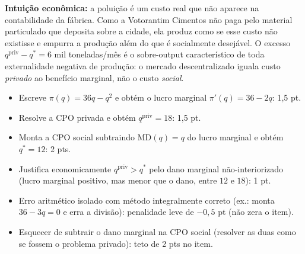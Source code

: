 \begin{solucao}
\textbf{Intuição econômica:} a poluição é um custo real que não aparece na contabilidade da fábrica. Como a Votorantim Cimentos não paga pelo material particulado que deposita sobre a cidade, ela produz como se esse custo não existisse e empurra a produção além do que é socialmente desejável. O excesso $q^{\text{priv}}-q^{*}=6$ mil toneladas/mês é o sobre-output característico de toda externalidade negativa de produção: o mercado descentralizado iguala custo \emph{privado} ao benefício marginal, não o custo \emph{social}.
\rubricalabel
\begin{itemize}
\item Escreve $\pi(q)=36q-q^{2}$ e obtém o lucro marginal $\pi'(q)=36-2q$: 1{,}5 pt.
\item Resolve a CPO privada e obtém $q^{\text{priv}}=18$: 1{,}5 pt.
\item Monta a CPO social subtraindo $\text{MD}(q)=q$ do lucro marginal e obtém $q^{*}=12$: 2 pts.
\item Justifica economicamente $q^{\text{priv}}>q^{*}$ pelo dano marginal não-interiorizado (lucro marginal positivo, mas menor que o dano, entre $12$ e $18$): 1 pt.
\item Erro aritmético isolado com método integralmente correto (ex.: monta $36-3q=0$ e erra a divisão): penalidade leve de $-0{,}5$ pt (não zera o item).
\item Esquecer de subtrair o dano marginal na CPO social (resolver as duas como se fossem o problema privado): teto de 2 pts no item.
\end{itemize}
\end{solucao}


